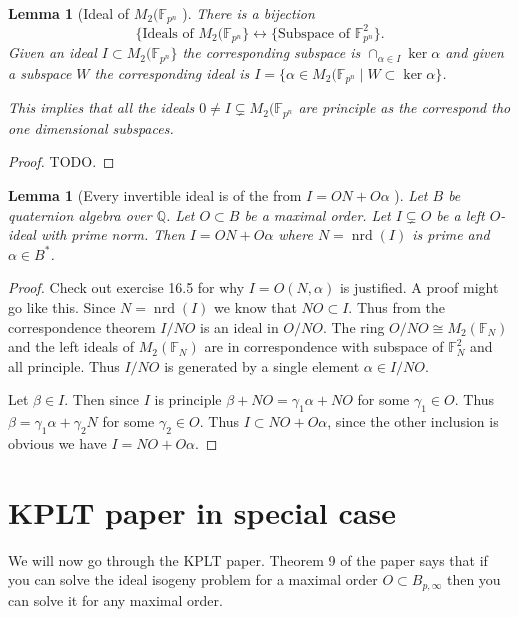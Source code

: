\documentclass[10pt]{article}
\theoremstyle{plain}
\newtheorem{lemma}[theorem]{Lemma}
\theoremstyle{definition}
\newcommand{\iso}{\cong}
\newcommand{\op}{\operatorname}
\newcommand{\Q}{\mathbb{Q}}
\newcommand{\F}{\mathbb{F}}
\newcommand{\nrd}{\op{nrd}}
\begin{document}
\begin{lemma}[Ideal of \( M_2(\F_{p^n} \) ]
    There is a bijection
    \[
        \{\text{Ideals of } M_2(\F_{p^n}\} \leftrightarrow \{ \text{Subspace of } \F_{p^n}^2 \}.
    \]
    Given an ideal \( I \subset  M_2(\F_{p^n}\} \) the corresponding subspace is \( \cap_{\alpha \in I} \ker \alpha \) and given a subspace \( W \) the corresponding ideal is \( I = \{\alpha \in M_2(\F_{p^n} \mid W \subset \ker \alpha\} \).

    This implies that all the ideals \( 0 \neq I \subsetneq M_2(\F_{p^n} \) are principle as the correspond tho one dimensional subspaces.
\end{lemma}
\begin{proof}
    TODO.
\end{proof}

\begin{lemma}[Every invertible ideal is of the from \( I = ON + O\alpha \) ]
    Let \( B \) be quaternion algebra over \( \Q \).
    Let \( O \subset B \) be a maximal order.
    Let \( I \subsetneq O \) be a left \( O \)-ideal with prime norm.
    Then \( I = ON + O \alpha \) where \( N = \nrd(I) \) is prime and \( \alpha \in B^* \).
\end{lemma}
\begin{proof}
    {\color{red} Check out exercise 16.5 for why \( I = O(N, \alpha) \) is justified.}
    A proof might go like this.
    Since \( N = \nrd(I) \) we know that \( NO \subset I \).
    Thus from the correspondence theorem \( I / NO \) is an ideal in \( O / NO \).
    The ring \( O / NO \iso M_2(\F_N) \) and the left ideals of \( M_2(\F_N) \) are in correspondence with subspace of \( \F_N^2 \) and all principle.
    Thus \( I / NO \) is generated by a single element \( \alpha \in I / NO \).

    Let \( \beta \in I \).
    Then since \( I \) is principle \( \beta + NO = \gamma_1 \alpha + NO \) for some \( \gamma_1 \in O \).
    Thus \( \beta = \gamma_1\alpha + \gamma_2N \) for some \( \gamma_2 \in O \).
    Thus \( I \subset NO + O\alpha \), since the other inclusion is obvious we have \( I =  NO + O\alpha \).
\end{proof}

\section{KPLT paper in special case}

We will now go through the KPLT paper.
Theorem 9 of the paper says that if you can solve the ideal isogeny problem for a maximal order \( O \subset B_{p, \infty} \) then you can solve it for any  maximal order.
\end{document}
